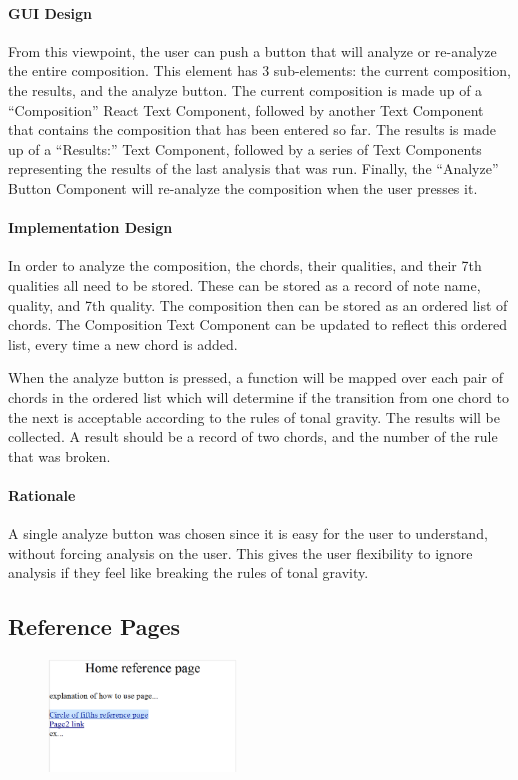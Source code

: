 \documentclass[onecolumn, draftclsnofoot,10pt, compsoc]{IEEEtran}
\begin{document}
\paragraph{GUI Design}
From this viewpoint, the user can push a button that will analyze or re-analyze the entire composition.
This element has 3 sub-elements: the current composition, the results, and the analyze button.
The current composition is made up of a “Composition” React Text Component, followed by another Text Component that contains the composition that has been entered so far.
The results is made up of a “Results:” Text Component, followed by a series of Text Components representing the results of the last analysis that was run.
Finally, the “Analyze” Button Component will re-analyze the composition when the user presses it.

\paragraph{Implementation Design}
In order to analyze the composition, the chords, their qualities, and their 7th qualities all need to be stored.
These can be stored as a record of note name, quality, and 7th quality.
The composition then can be stored as an ordered list of chords.
The Composition Text Component can be updated to reflect this ordered list, every time a new chord is added.

When the analyze button is pressed, a function will be mapped over each pair of chords in the ordered list which will determine if the transition from one chord to the next is acceptable according to the rules of tonal gravity.
The results will be collected.
A result should be a record of two chords, and the number of the rule that was broken.

\paragraph{Rationale}
A single analyze button was chosen since it is easy for the user to understand, without forcing analysis on the user.
This gives the user flexibility to ignore analysis if they feel like breaking the rules of tonal gravity.

\subsection{Reference Pages}
\begin{figure}[H]
    \centering
    \includegraphics[width=5cm]{references.eps}
\end{figure}
\end{document}

